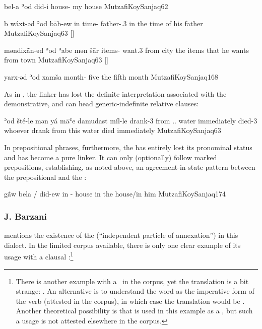 { 
{bel-a ʾod did-i}
{house-\free{} \lnk{} \sg}
{my house}
{MutzafiKoySanjaq}{62}

{b\cb{} wáxt-əd ʾod bāb-ew}
{in\cb{} time-\cst{} \lnk{} father-\poss.3\masc}
{in the time of his father}
{MutzafiKoySanjaq}{63 {[]}}

{məndixā́n-əd ʾod ʾabe mən šār}
{items-\cst{} \lnk{} want.3\masc{} from city}
{the items that he wants from town}
{MutzafiKoySanjaq}{63 {[]}}







{yarx-əd ʾod xamša}
{month-\cst{} \lnk{} five}
{the fifth month}
{MutzafiKoySanjaq}{168}

As in \Arb, the linker has lost the definite interpretation associated with the demonstrative, and can head generic-indefinite relative clauses:

{ʾod šté-le mən yá\cb{} māʿe damudast míl-le}
{\lnk{} drank-3\masc{} from \dem.\near.\sg\cb{} water immediately died-3\masc}
{whoever drank from this water died immediately}
{MutzafiKoySanjaq}{63}

In prepositional phrases, furthermore, the \lnk* has entirely lost its pronominal status and has become a pure linker. It can only (optionally) follow \cst* marked prepositions, establishing, as noted above, an agreement-in-state pattern between the prepositional \prim and the \lnk*:

{gā́w  bela / did-ew}
{in {-\cst{} \lnk{}} house {} \masc}
{in the house/in him}
{MutzafiKoySanjaq}{174}

\subsubsection{J. Barzani} 

\citet[3, fn.\ 15]{MutzafiBarzani} mentions the existence of the \lnk* (\enquote{independent particle of annexation})  in this dialect. In the limited corpus available, there is only one clear example of its usage with a clausal \secn:\footnote{There is another example with a \zero\ \prim in the corpus, yet the translation is a bit strange:  \citep[6 (31)]{MutzafiBarzani}. An alternative is to understand the word   as the imperative form of the verb  (attested in the corpus), in which case the translation would be . Another theoretical possibility is that  is used in this example as a \comp*, but such a usage is not attested elsewhere in the corpus.}

}

